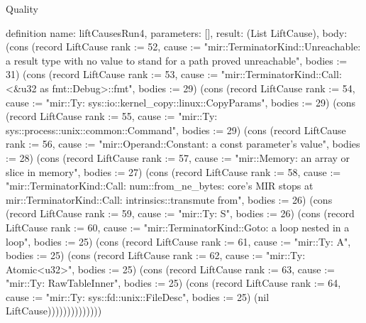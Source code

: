 \begin{lexlean}{Quality}
\begin{semanticmodule}
definition{
  name: liftCausesRun4,
  parameters: [],
  result: (List LiftCause),
  body: (cons (record LiftCause {rank := 52, cause := "mir::TerminatorKind::Unreachable: a result type with no value to stand for a path proved unreachable", bodies := 31}) (cons (record LiftCause {rank := 53, cause := "mir::TerminatorKind::Call: <&u32 as fmt::Debug>::fmt", bodies := 29}) (cons (record LiftCause {rank := 54, cause := "mir::Ty: sys::io::kernel_copy::linux::CopyParams", bodies := 29}) (cons (record LiftCause {rank := 55, cause := "mir::Ty: sys::process::unix::common::Command", bodies := 29}) (cons (record LiftCause {rank := 56, cause := "mir::Operand::Constant: a const parameter's value", bodies := 28}) (cons (record LiftCause {rank := 57, cause := "mir::Memory: an array or slice in memory", bodies := 27}) (cons (record LiftCause {rank := 58, cause := "mir::TerminatorKind::Call: num::from_ne_bytes: core's MIR stops at mir::TerminatorKind::Call: intrinsics::transmute from", bodies := 26}) (cons (record LiftCause {rank := 59, cause := "mir::Ty: S", bodies := 26}) (cons (record LiftCause {rank := 60, cause := "mir::TerminatorKind::Goto: a loop nested in a loop", bodies := 25}) (cons (record LiftCause {rank := 61, cause := "mir::Ty: A", bodies := 25}) (cons (record LiftCause {rank := 62, cause := "mir::Ty: Atomic<u32>", bodies := 25}) (cons (record LiftCause {rank := 63, cause := "mir::Ty: RawTableInner", bodies := 25}) (cons (record LiftCause {rank := 64, cause := "mir::Ty: sys::fd::unix::FileDesc", bodies := 25}) (nil LiftCause))))))))))))))
}


\end{semanticmodule}
\end{lexlean}
